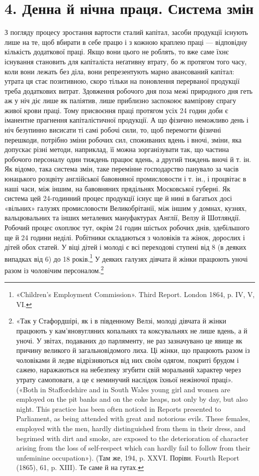 \section*{4. Денна й нічна праця. Система змін}

З погляду процесу зростання вартости сталий капітал, засоби
продукції існують лише на те, щоб вбирати в себе працю і з кожною
краплею праці — відповідну кількість додаткової праці.
Якщо вони цього не роблять, то вже саме їхнє існування становить
для капіталіста неґативну втрату, бо ж протягом того часу,
коли вони лежать без діла, вони репрезентують марно авансований
капітал: утрата ця стає позитивною, скоро тільки на поновлення
перерваної продукції треба додаткових витрат. Здовження
робочого дня поза межі природного дня геть аж у ніч діє
лише як паліятив, лише приблизно заспокоює вампірову спрагу
живої крови праці. Тому присвоєння праці протягом усіх 24 годин
доби є іманентне прагнення капіталістичної продукції. А що
фізично неможливо день і ніч безупинно висисати ті самі робочі
сили, то, щоб перемогти фізичні перешкоди, потрібно зміни робочих
сил, споживаних вдень і вночі, зміни, яка допускає різні
методи, наприклад, її можна зорганізувати так, що частина робочого
персоналу один тиждень працює вдень, а другий тиждень
вночі й т. ін. Як відомо, така система змін, таке перемінне господарство
панувало за часів юнацького розцвіту англійської бавовняної
промисловости і т. ін., і процвітає в наші часи, між
іншим, на бавовняних прядільнях Московської губерні. Як система
цей 24-годинний процес продукції існує ще й нині в багатьох
досі «вільних» галузях промисловости Великобрітанії, між іншим
у домнах, кузнях, вальцювальних та інших металевих мануфактурах
Англії, Велзу й Шотляндії. Робочий процес охоплює тут,
окрім 24 годин шістьох робочих днів, здебільшого ще й 24 години
неділі. Робітники складаються з чоловіків та жінок, дорослих
і дітей обох статей. У віці дітей і молоді є всі переходові ступені
від 8 (в деяких випадках від 6) до 18 років.\footnote{
«Children’s Employment Commission». Third Report. London
1864, p. IV, V, VI.
} У деяких галузях
дівчата й жінки працюють уночі разом із чоловічим персоналом.\footnote{
«Так у Стафордшірі, як і в південному Велзі, молоді дівчата й жінки
працюють у кам’яновугляних копальнях та коксувальнях не лише вдень,
а й уночі. У звітах, подаваних до парляменту, не раз зазначувано це
явище як причину великого й загальновідомого лиха. Ці жінки, що працюють
разом із чоловіками й ледве відрізняються від них своїм одягом,
покриті брудом і сажею, наражаються на небезпеку згубити свій моральний
характер через утрату самоповаги, а це є неминучий наслідок їхньої
нежіночої праці». («Both in Staffordshire and in South Wales young girl
and women are employed on the pit banks and on the coke heaps, not only
by day, but also night. This practice has been often noticed in Reports presented
to Parliament, as being attended with great and notorious evils.
These females, employed with the men, hardly distinguished from them
in their dress, and begrimed with dirt and smoke, are exposed to the deterioration
of character arising from the loss of self-respect which can hardly
fail to follow from their unfeminine occupation»). (Там же, 194, p. XXVI.
Порівн. Fourth Report (1865), 61, p. XIII). Те саме й на гутах.
}
